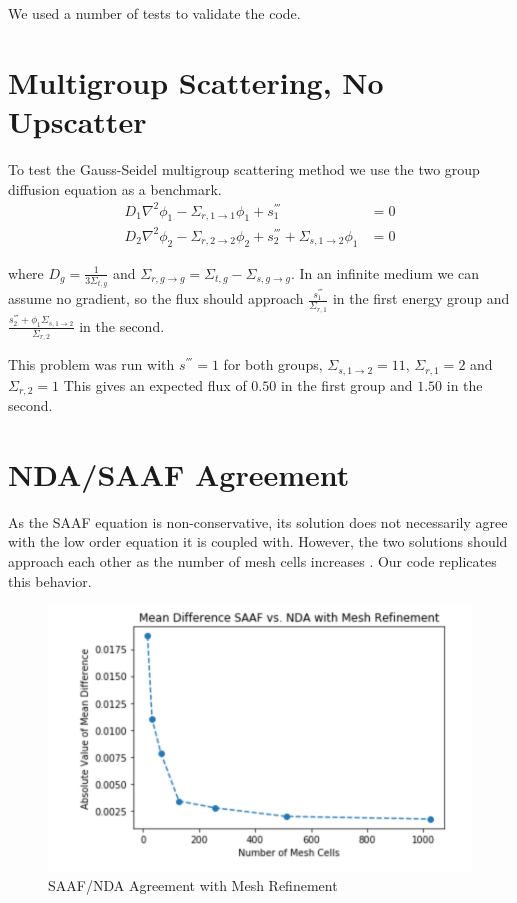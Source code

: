 We used a number of tests to validate the code. 


\section{Multigroup Scattering, No Upscatter}
To test the Gauss-Seidel multigroup scattering method we use the two group diffusion equation as a benchmark. 
\begin{align}
 D_1\nabla^2 \phi_1 - \Sigma_{r, 1 \rightarrow 1} \phi_1 + s_1^{'''} &= 0 \\
 D_2\nabla^2 \phi_2 - \Sigma_{r, 2 \rightarrow 2} \phi_2 + s_2^{'''} + \Sigma_{s, 1 \rightarrow 2} \phi_1 &= 0
\end{align}

where $D_g = \frac{1}{3\Sigma_{t, g}}$ and $\Sigma_{r, g \rightarrow g} = \Sigma_{t, g} - \Sigma_{s, g \rightarrow g}$. In an infinite medium we can assume no gradient, so the flux should approach $\frac{s_1^{'''}}{\Sigma_{r, 1}}$ in the first energy group and $\frac{s_2^{'''} + \phi_1 \Sigma_{s, 1 \rightarrow 2}}{\Sigma_{r, 2}}$ in the second.  

This problem was run with $ s^{'''} = 1$ for both groups, $\Sigma_{s, 1\rightarrow 2} = 11$, $\Sigma_{r, 1} = 2$ and $\Sigma_{r, 2} = 1$ This gives an expected flux of $0.50 $ in the first group and $1.50$ in the second. 

\section{NDA/SAAF Agreement}
As the SAAF equation is non-conservative, its solution does not necessarily agree with the low order equation it is coupled with. However, the two solutions should approach each other as the number of mesh cells increases \cite{Wang2013}. Our code replicates this behavior. 
\begin{figure}
    \centering
    \includegraphics[width=.75\textwidth]{fig/SAAFvsNDA}
    \caption{SAAF/NDA Agreement with Mesh Refinement}
    \label{fig:SAAFvsNDA}
\end{figure}